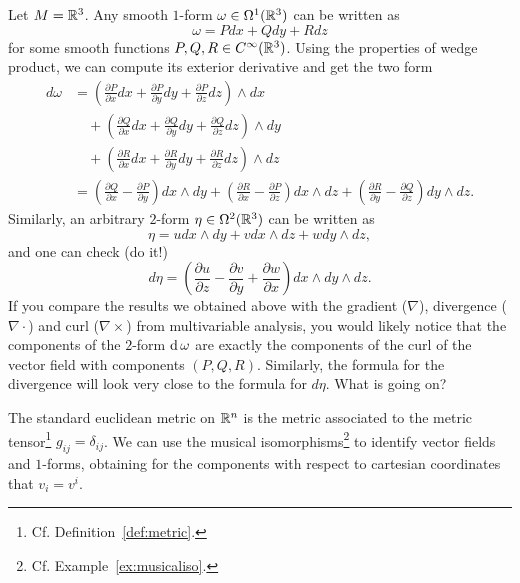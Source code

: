 \begin{example}
  Let $M=\mathbb{R}^3$. Any smooth $1$-form $\omega\in\Omega^1(\mathbb{R}^3)$ can be written as
  \begin{equation}
    \omega = P dx + Q dy + R dz
  \end{equation}
  for some smooth functions $P,Q,R\in C^\infty(\mathbb{R}^3)$.
  Using the properties of wedge product, we can compute its exterior derivative and get the two form
  \begin{align}
    d\omega & = \left(\frac{\partial P}{\partial x} dx + \frac{\partial P}{\partial y} dy + \frac{\partial P}{\partial z} dz \right) \wedge dx     \\
            & \quad+\left(\frac{\partial Q}{\partial x} dx + \frac{\partial Q}{\partial y} dy + \frac{\partial Q}{\partial z} dz \right) \wedge dy \\
            & \quad+\left(\frac{\partial R}{\partial x} dx + \frac{\partial R}{\partial y} dy + \frac{\partial R}{\partial z} dz \right) \wedge dz \\
            & = \left(\frac{\partial Q}{\partial x} - \frac{\partial P}{\partial y}\right) dx \wedge dy +
    \left(\frac{\partial R}{\partial x} - \frac{\partial P}{\partial z}\right) dx \wedge dz + \left(\frac{\partial R}{\partial y} - \frac{\partial Q}{\partial z}\right) dy \wedge dz.
  \end{align}
  Similarly, an arbitrary $2$-form $\eta\in\Omega^2(\mathbb{R}^3)$ can be written as
  \begin{equation}
    \eta = u dx\wedge dy + v dx\wedge dz + w dy\wedge dz,
  \end{equation}
  and one can check (do it!)
  \begin{equation}
    d\eta = \left(\frac{\partial u}{\partial z}-\frac{\partial v}{\partial y} + \frac{\partial w}{\partial x}\right) dx\wedge dy \wedge dz.
  \end{equation}
  If you compare the results we obtained above with the gradient ($\nabla$), divergence ($\nabla\cdot$) and curl ($\nabla\times$) from multivariable analysis, you would likely notice that the components of the $2$-form $\operatorname{d}\omega$ are exactly the components of the curl of the vector field with components $(P, Q, R)$.
  Similarly, the formula for the divergence will look very close to the formula for $d\eta$.
  What is going on?

  The standard euclidean metric on $\mathbb{R}^n$ is the metric associated to the metric tensor\footnote{Cf. Definition~\ref{def:metric}.} $g_{ij} = \delta_{ij}$.
  We can use the musical isomorphisms\footnote{Cf. Example~\ref{ex:musicaliso}.} to identify vector fields and $1$-forms, obtaining for the components with respect to cartesian coordinates that $v_i = v^i$.


\end{example}
